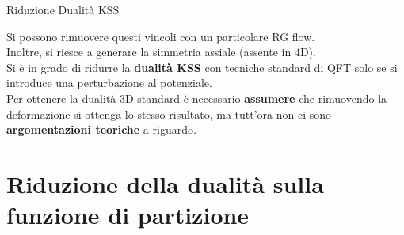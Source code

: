 \documentclass[10pt,compress,usenames,dvipsnames]{beamer}
\begin{document}

\begin{frame}{Riduzione Dualità KSS}

Si possono rimuovere questi vincoli con un particolare RG flow.\\
Inoltre, si riesce a generare la simmetria assiale (\alert{assente in 4D}).
\\
\vspace{0,3cm}
Si è in grado di ridurre la \alert{\bfseries dualità KSS} con tecniche standard di QFT solo se si introduce una perturbazione al potenziale. \\
\vspace{0,3cm}
Per ottenere la dualità 3D standard è necessario \alert{\bfseries assumere} che rimuovendo la deformazione si ottenga lo stesso risultato, 
ma tutt'ora non ci sono \alert{\bfseries argomentazioni teoriche} a riguardo.

\end{frame}





\section{Riduzione della dualità sulla funzione di partizione}
\end{document}
